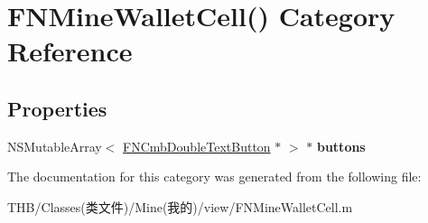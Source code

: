 \hypertarget{category_f_n_mine_wallet_cell_07_08}{}\section{F\+N\+Mine\+Wallet\+Cell() Category Reference}
\label{category_f_n_mine_wallet_cell_07_08}
\subsection*{Properties}
\begin{DoxyCompactItemize}
\item 
\mbox{\label{category_f_n_mine_wallet_cell_07_08_ad15ffa6bb2f2355f26efc5bfb907f7a9}} 
N\+S\+Mutable\+Array$<$ \mbox{\hyperlink{interface_f_n_cmb_double_text_button}{F\+N\+Cmb\+Double\+Text\+Button}} $\ast$ $>$ $\ast$ {\bfseries buttons}
\end{DoxyCompactItemize}


The documentation for this category was generated from the following file\+:\begin{DoxyCompactItemize}
\item 
T\+H\+B/\+Classes(类文件)/\+Mine(我的)/view/F\+N\+Mine\+Wallet\+Cell.\+m\end{DoxyCompactItemize}

